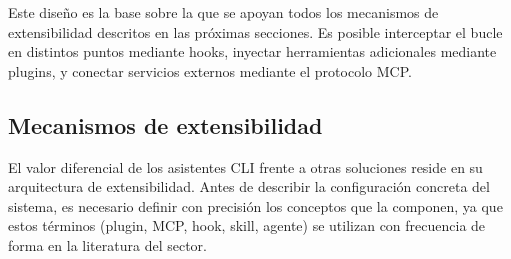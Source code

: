 \documentclass[11pt, letterpaper]{article}
\begin{document}
Este diseño es la base sobre la que se apoyan todos los mecanismos de extensibilidad descritos en las próximas secciones. Es posible interceptar el bucle en distintos puntos mediante hooks, inyectar herramientas adicionales mediante plugins, y conectar servicios externos mediante el protocolo MCP.

\newpage

\subsection{Mecanismos de extensibilidad}
\label{sec:mecanismos_extensibilidad}
El valor diferencial de los asistentes CLI frente a otras soluciones reside en su arquitectura de extensibilidad. Antes de describir la configuración concreta del sistema, es necesario definir con precisión los conceptos que la componen, ya que estos términos (plugin, MCP, hook, skill, agente) se utilizan con frecuencia de forma en la literatura del sector.
\end{document}
